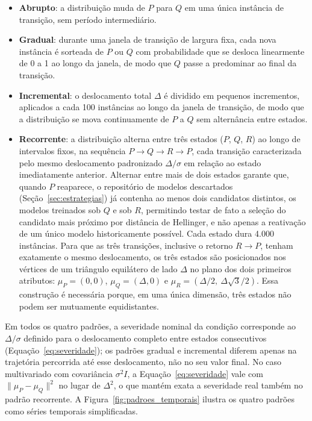 \begin{itemize}
  \item \textbf{Abrupto}: a distribuição muda de $P$ para $Q$ em uma única
  instância de transição, sem período intermediário.
  \item \textbf{Gradual}: durante uma janela de transição de largura fixa,
  cada nova instância é sorteada de $P$ ou $Q$ com probabilidade que se
  desloca linearmente de 0 a 1 ao longo da janela, de modo que $Q$ passe a
  predominar ao final da transição.
  \item \textbf{Incremental}: o deslocamento total $\Delta$ é dividido em
  pequenos incrementos, aplicados a cada 100 instâncias ao longo da
  janela de transição, de modo que a distribuição se mova continuamente de
  $P$ a $Q$ sem alternância entre estados.
  \item \textbf{Recorrente}: a distribuição alterna entre três estados
  ($P$, $Q$, $R$) ao longo de intervalos fixos, na sequência $P \to Q \to R
  \to P$, cada transição caracterizada pelo mesmo deslocamento padronizado
  $\Delta/\sigma$ em relação ao estado imediatamente anterior. Alternar
  entre mais de dois estados garante que, quando $P$ reaparece, o
  repositório de modelos descartados (Seção~\ref{sec:estrategias}) já
  contenha ao menos dois candidatos distintos, os modelos treinados sob
  $Q$ e sob $R$, permitindo testar de fato a seleção do candidato mais
  próximo por distância de Hellinger, e não apenas a reativação de um único
  modelo historicamente possível. Cada estado dura 4.000 instâncias. Para que
  as três transições, inclusive o retorno $R \to P$, tenham exatamente o
  mesmo deslocamento, os três estados são posicionados nos vértices de um
  triângulo equilátero de lado $\Delta$ no plano dos dois primeiros
  atributos: $\mu_P = (0, 0)$, $\mu_Q = (\Delta, 0)$ e
  $\mu_R = (\Delta/2,\ \Delta\sqrt{3}/2)$. Essa construção é necessária
  porque, em uma única dimensão, três estados não podem ser mutuamente
  equidistantes.
\end{itemize}

Em todos os quatro padrões, a severidade nominal da condição corresponde ao
$\Delta/\sigma$ definido para o deslocamento completo entre estados
consecutivos (Equação~\ref{eq:severidade}); os padrões gradual e incremental
diferem apenas na trajetória percorrida até esse deslocamento, não no seu
valor final. No caso multivariado com covariância $\sigma^2 I$, a
Equação~\ref{eq:severidade} vale com $\lVert \mu_P - \mu_Q \rVert^2$ no lugar
de $\Delta^2$, o que mantém exata a severidade real também no padrão
recorrente. A Figura~\ref{fig:padroes_temporais} ilustra os quatro padrões
como séries temporais simplificadas.

